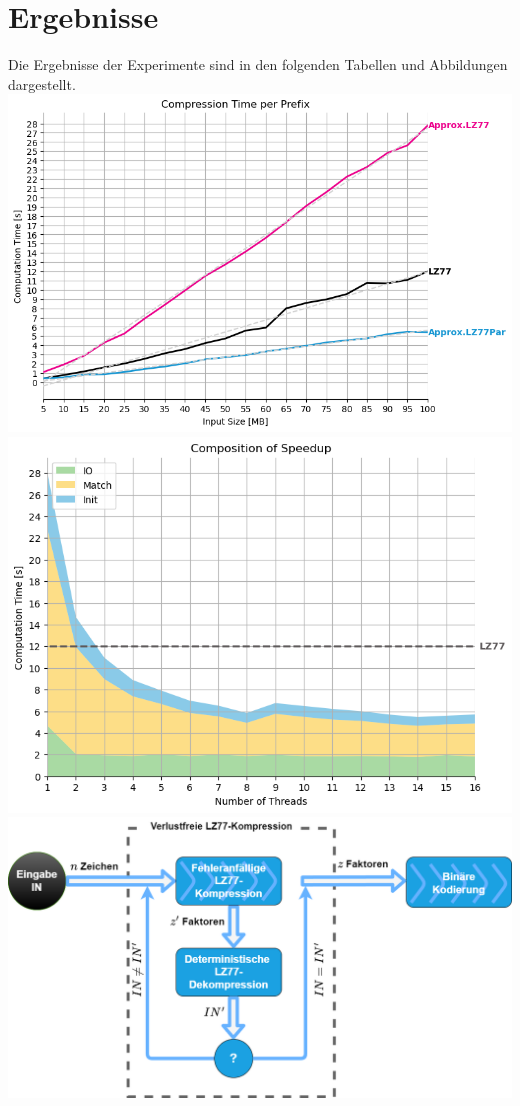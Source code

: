 \section{Ergebnisse}
Die Ergebnisse der Experimente sind in den folgenden Tabellen und Abbildungen dargestellt.\\
\includegraphics[scale = 0.65]{bilder/progressive.png}\\
\includegraphics[scale = 0.65]{bilder/progressive_speedup_stack.png}\\
\includegraphics[scale = 0.4]{bilder/lasvegas_algorithm.png}